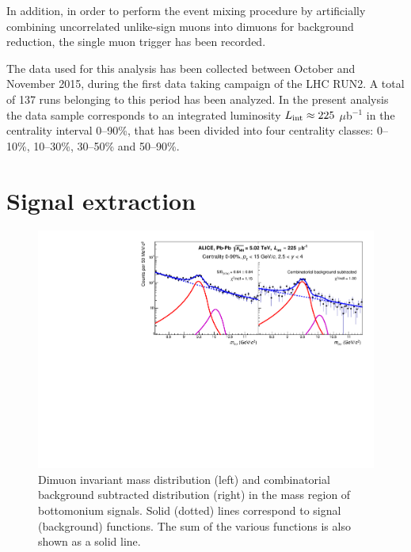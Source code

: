 In addition, in order to perform the event mixing procedure by artificially combining uncorrelated unlike-sign muons into dimuons for background reduction, the single muon trigger has been recorded.

The data used for this analysis has been collected between October and November 2015, during the first \pbpb data taking campaign of the  LHC RUN2.
A total of 137 runs belonging to this period has been analyzed.
In the present analysis the data sample corresponds to an integrated luminosity $L_{\rm int}\approx 225$ $\mu$b$^{-1}$ in the centrality interval 0--90\%, that has been divided into four centrality classes: 0--10\%, 10--30\%, 30--50\% and 50--90\%.

\section{Signal extraction}

\begin{figure}[!b]
\begin{center}
\includegraphics[width=0.8\linewidth]{Chapters/Analysis/Figs/InvMass_Upsilon_Performance_Ylog.pdf}
\caption{Dimuon invariant mass distribution (left) and combinatorial background subtracted distribution (right) in the mass region of bottomonium signals. Solid (dotted) lines correspond to signal (background) functions. The sum of the various functions is also shown as a solid line.}
\label{fig:mass_dist}
\end{center}
\end{figure}

